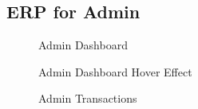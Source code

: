 \subsection{ERP for Admin}
\begin{figure}[H]
	\begin{center}
		\caption{Admin Dashboard}
		\label{manage}
	\end{center}
\end{figure}
\begin{figure}[H]
	\begin{center}
		\caption{Admin Dashboard Hover Effect}
	\end{center}
\end{figure}

\begin{figure}[H]
	\begin{center}
		\centering
		\caption{Admin Transactions}
	\end{center}
\end{figure}

